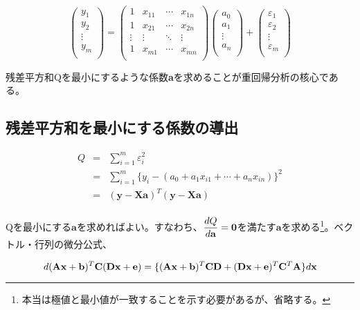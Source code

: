 \[
\left(
\begin{array}{c}
y_1\\
y_2\\
\vdots\\
y_m\\
\end{array}
\right)
=
\left(
\begin{array}{cccc}
1      & x_{11} & \cdots & x_{1n}\\ 
1      & x_{21} & \cdots & x_{2n}\\
\vdots & \vdots & \ddots & \vdots\\
1      & x_{m1} & \cdots & x_{mn}\\
\end{array}
\right)
\left(
\begin{array}{c}
a_0\\
a_1\\
\vdots\\
a_n\\
\end{array}
\right)
+
\left(
\begin{array}{c}
\varepsilon_1\\
\varepsilon_2\\
\vdots\\
\varepsilon_m\\
\end{array}
\right)
\]

残差平方和Qを最小にするような係数{\bf a}を求めることが重回帰分析の核心である。

\subsection{残差平方和を最小にする係数の導出}

\begin{eqnarray*}
Q  & = &  \sum^m_{i=1} \varepsilon^2_i \\
   & = & \sum^{m}_{i=1} \{y_i - ( a_0 + a_1 x_{i1} + \cdots + a_n x_{in})\}^2\\
 & = & ({\mathbf y} - {\mathbf X}{\mathbf a})^T({\mathbf y} - {\mathbf X}{\mathbf a})\\
\end{eqnarray*}

Qを最小にする\({\mathbf a}\)を求めればよい。すなわち、\({\displaystyle \frac{dQ}{d{\bf a}} = {\bf 0}}\)を満たす\({\mathbf a}\)を求める\footnote{本当は極値と最小値が一致することを示す必要があるが、省略する。}。ベクトル・行列の微分公式、

\[
d ({\bf Ax + b})^T {\mathbf C} ({\bf Dx + e}) = \{({\bf Ax + b})^T {\bf CD} +({\bf Dx + e})^T{\mathbf C}^T{\mathbf A}\}d{\mathbf x}
\]

